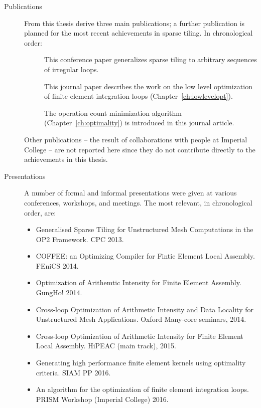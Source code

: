 \begin{description}
\item[Publications] From this thesis derive three main publications; a further publication is planned for the most recent achievements in sparse tiling. In chronological order:
\begin{description}
\item[\citep{st-paper}] This conference paper generalizes sparse tiling to arbitrary sequences of irregular loops.
\item[\citep{Luporini-coffee}] This journal paper describes the work on the low level optimization of finite element integration loops (Chapter~\ref{ch:lowlevelopt}).
\item[\citep{Luporini-minimalflops}] The operation count minimization algorithm (Chapter~\ref{ch:optimality}) is introduced in this journal article.
\end{description}
Other publications -- the result of collaborations with people at Imperial College -- are not reported here since they do not contribute directly to the achievements in this thesis.
\item[Presentations] A number of formal and informal presentations were given at various conferences, workshops, and meetings. The most relevant, in chronological order, are:
\begin{itemize}
\item Generalised Sparse Tiling for Unstructured Mesh Computations in the OP2 Framework. CPC 2013.
\item COFFEE: an Optimizing Compiler for Fintie Element Local Assembly. FEniCS 2014.
\item Optimization of Arithemtic Intensity for Finite Element Assembly. GungHo! 2014.
\item Cross-loop Optimization of Arithmetic Intensity and Data Locality for Unstructured Mesh Applications. Oxford Many-core seminars, 2014.
\item Cross-loop Optimization of Arithmetic Intensity for Finite Element Local Assembly. HiPEAC (main track), 2015.
\item Generating high performance finite element kernels using optimality criteria. SIAM PP 2016.
\item An algorithm for the optimization of finite element integration loops. PRISM Workshop (Imperial College) 2016.
\end{itemize}
\end{description}


